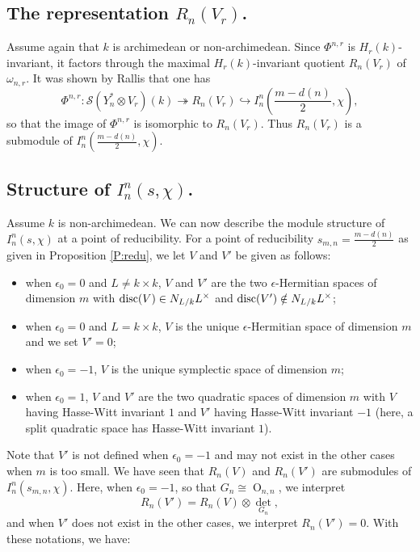 \documentclass[10pt]{amsart}
\theoremstyle{plain}
\numberwithin{equation}{section}
\begin{document}
\subsection{\bf The representation $R_n(V_r)$.} 
Assume again that $k$ is  archimedean or  non-archimedean. Since
$\Phi^{n,r}$ is $H_r(k)$-invariant, it factors through the
maximal $H_r(k)$-invariant quotient $R_n(V_r)$ of $\omega_{n, r}$. It
was shown by Rallis that one has
\[  
\Phi^{n,r}:  \mathcal{S}(Y_n^* \otimes V_r)(k) \twoheadrightarrow
R_n(V_r) \hookrightarrow I^n_n(\frac{m - d(n)}{2},\chi), 
\]
so that the image of $\Phi^{n,r}$ is isomorphic to $R_n(V_r)$.  
 Thus $R_n(V_r)$ is a submodule of $I^n_n(\frac{m - d(n)}{2},\chi)$. 
 \vskip 10pt
 
 \subsection{\bf Structure of $I^n_n(s,\chi)$.} \label{SS:str} 
 Assume $k$ is non-archimedean. We can now describe the module
 structure of $I^n_n(s, \chi)$ at a point of reducibility.   
   For a point of reducibility
  $s_{m,n} = \frac{m - d(n)}{2} $ as given in Proposition
  \ref{P:redu}, we let $V$ and $V'$ be given as follows:
  \vskip 5pt
  
\begin{itemize}
  \item when $\epsilon_0 = 0$ and $L\neq k\times k$, $V$ and $V'$ are the two
    $\epsilon$-Hermitian spaces of dimension $m$ with ${{\rm disc}}(V) \in
    N_{L/k}L^{\times}$ and ${{\rm disc}}(V') \notin N_{L/k}L^{\times}$;
\item when $\epsilon_0 = 0$ and $L=k\times k$, $V$ is the unique $\epsilon$-Hermitian space of dimension $m$ and we set $V' = 0$;
  \item when $\epsilon_0 = -1$, $V$ is the unique symplectic space of
    dimension $m$;
  \item when $\epsilon_0 = 1$, $V$ and $V'$ are the two quadratic
    spaces of dimension $m$ with $V$ having  Hasse-Witt invariant $1$ 
    and $V'$ having  Hasse-Witt invariant $-1$ (here, a split quadratic space has Hasse-Witt invariant $1$).
\end{itemize}
Note that $V'$ is not defined when $\epsilon_0 = -1$ and may not exist
in the other cases when $m$ is too small.   We have seen that 
$R_n(V)$ and $R_n(V')$ are submodules of $I^n_n(s_{m,n}, \chi)$.
Here, when $\epsilon_0 = -1$, so that $G_n \cong {\operatorname{O}}_{n,n}$, we
interpret 
\[  R_n(V') = R_n(V) \otimes {\det}_{G_n}, \]
and when $V'$ does not exist in the other cases, we interpret
$R_n(V') = 0$. With these notations, we have: 
 \vskip 5pt
 
\end{document}
